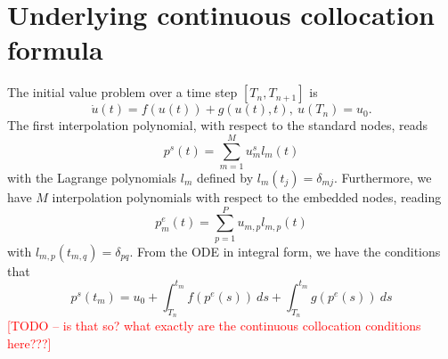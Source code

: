\documentclass{article}
\newcommand{\todo}[1]{\textcolor{red}{[TODO -- #1]}}
\begin{document}
\section{Underlying continuous collocation formula}
The initial value problem over a time step $[T_n, T_{n+1}]$ is
\begin{equation}
	\dot{u}(t) = f(u(t)) + g(u(t), t), \ u(T_n) = u_0.
\end{equation}
The first interpolation polynomial, with respect to the standard nodes, reads
\begin{equation}
	p^s(t) = \sum_{m=1}^{M} u^s_m l_m(t)
\end{equation}
with the Lagrange polynomials $l_m$ defined by $l_m(t_j) = \delta_{mj}$.
Furthermore, we have $M$ interpolation polynomials with respect to the embedded nodes, reading
\begin{equation}
	p^e_m(t) = \sum_{p=1}^{P} u_{m,p} l_{m,p}(t)
\end{equation}
with $l_{m,p}(t_{m,q}) = \delta_{p q}$.
From the ODE in integral form, we have the conditions that
\begin{equation}
	p^s(t_m) = u_0 + \int_{T_n}^{t_m} f(p^e(s))~ds + \int_{T_n}^{t_m} g(p^e(s))~ds
\end{equation}
\todo{is that so? what exactly are the continuous collocation conditions here???}
\end{document}
